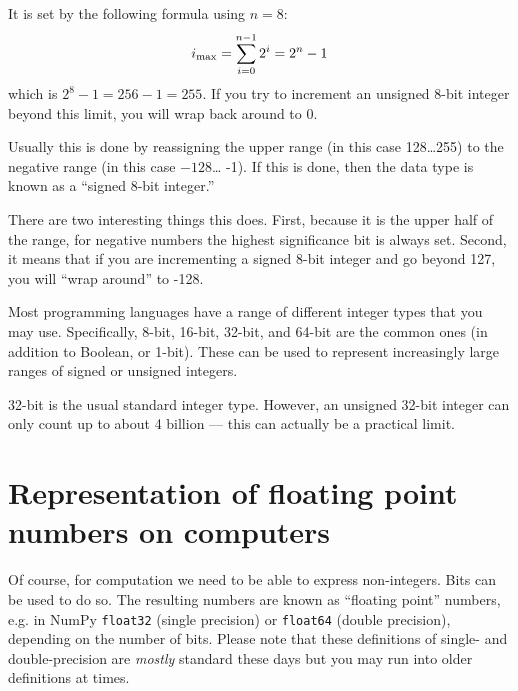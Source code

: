 
\begin{answer}
  It is set by the following formula using $n=8$:
  \begin{equation}
    i_{\rm max} = \sum_{i=0}^{n-1} 2^i = 2^n - 1
  \end{equation}
  which is $2^8 - 1 = 256 - 1 = 255$. If you try to increment an
  unsigned 8-bit integer beyond this limit, you will wrap back around to
  0.
\end{answer}


\begin{answer}
  Usually this is done by reassigning the upper range (in this
  case 128\ldots 255) to the negative range (in this case $-128$\ldots
  -1). If this is done, then the data type is known as a ``signed
  8-bit integer.''

  There are two interesting things this does. First, because it is the
  upper half of the range, for negative numbers the highest
  significance bit is always set. Second, it means that if you are
  incrementing a signed 8-bit integer and go beyond 127, you will
  ``wrap around'' to -128.
\end{answer}

Most programming languages have a range of different integer types
that you may use. Specifically, 8-bit, 16-bit, 32-bit, and 64-bit are
the common ones (in addition to Boolean, or 1-bit).  These can be used
to represent increasingly large ranges of signed or unsigned integers.

32-bit is the usual standard integer type. However, an unsigned 32-bit
integer can only count up to about 4 billion --- this can actually be
a practical limit. 

\section{Representation of floating point numbers on computers}

Of course, for computation we need to be able to express
non-integers. Bits can be used to do so. The resulting numbers are
known as ``floating point'' numbers, e.g. in NumPy {\tt float32}
(single precision) or {\tt float64} (double precision), depending on
the number of bits. Please note that these definitions of single- and
double-precision are {\it mostly} standard these days but you may run
into older definitions at times.

